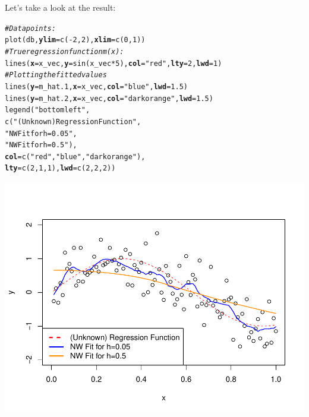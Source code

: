 \documentclass[14pt]{extreport}\usepackage[]{graphicx}\usepackage[]{xcolor}
\makeatletter
\def\maxwidth{ %
  \ifdim\Gin@nat@width>\linewidth
    \linewidth
  \else
    \Gin@nat@width
  \fi
}
\newcommand{\hlnum}[1]{\textcolor[rgb]{0.69,0.494,0}{#1}}%
\newcommand{\hlstr}[1]{\textcolor[rgb]{0.749,0.012,0.012}{#1}}%
\newcommand{\hlcom}[1]{\textcolor[rgb]{0.514,0.506,0.514}{\textit{#1}}}%
\newcommand{\hlopt}[1]{\textcolor[rgb]{0,0,0}{#1}}%
\newcommand{\hlstd}[1]{\textcolor[rgb]{0,0,0}{#1}}%
\newcommand{\hlkwc}[1]{\textcolor[rgb]{0,0,0}{\textbf{#1}}}%
\newcommand{\hlkwd}[1]{\textcolor[rgb]{0.004,0.004,0.506}{#1}}%
\newenvironment{kframe}{%
 \def\at@end@of@kframe{}%
 \ifinner\ifhmode%
  \def\at@end@of@kframe{\end{minipage}}%
  \begin{minipage}{\columnwidth}%
 \fi\fi%
 \def\FrameCommand##1{\hskip\@totalleftmargin \hskip-\fboxsep
 \colorbox{shadecolor}{##1}\hskip-\fboxsep
     \hskip-\linewidth \hskip-\@totalleftmargin \hskip\columnwidth}%
 \MakeFramed {\advance\hsize-\width
   \@totalleftmargin\z@ \linewidth\hsize
   \@setminipage}}%
 {\par\unskip\endMakeFramed%
 \at@end@of@kframe}
\newenvironment{knitrout}{}{} %
\makeatother
\begin{document}
Let's take a look at the result:
\begin{knitrout}
\color{fgcolor}\begin{kframe}
\begin{alltt}
\hlcom{# Data points:}
\hlkwd{plot}\hlstd{(db,} \hlkwc{ylim}\hlstd{=}\hlkwd{c}\hlstd{(}\hlopt{-}\hlnum{2}\hlstd{,}\hlnum{2}\hlstd{),} \hlkwc{xlim}\hlstd{=}\hlkwd{c}\hlstd{(}\hlnum{0}\hlstd{,}\hlnum{1}\hlstd{))}
\hlcom{# True regression function m(x):}
\hlkwd{lines}\hlstd{(}\hlkwc{x}\hlstd{=x_vec,} \hlkwc{y}\hlstd{=}\hlkwd{sin}\hlstd{(x_vec} \hlopt{*} \hlnum{5}\hlstd{),} \hlkwc{col}\hlstd{=}\hlstr{"red"}\hlstd{,} \hlkwc{lty}\hlstd{=}\hlnum{2}\hlstd{,} \hlkwc{lwd}\hlstd{=}\hlnum{1}\hlstd{)}
\hlcom{# Plotting the fitted values }
\hlkwd{lines}\hlstd{(}\hlkwc{y}\hlstd{= m_hat.1,} \hlkwc{x} \hlstd{= x_vec,} \hlkwc{col}\hlstd{=}\hlstr{"blue"}\hlstd{,}       \hlkwc{lwd}\hlstd{=}\hlnum{1.5}\hlstd{)}
\hlkwd{lines}\hlstd{(}\hlkwc{y}\hlstd{= m_hat.2,} \hlkwc{x} \hlstd{= x_vec,} \hlkwc{col}\hlstd{=}\hlstr{"darkorange"}\hlstd{,} \hlkwc{lwd}\hlstd{=}\hlnum{1.5}\hlstd{)}
\hlkwd{legend}\hlstd{(}\hlstr{"bottomleft"}\hlstd{,}
      \hlkwd{c}\hlstd{(}\hlstr{"(Unknown) Regression Function"}\hlstd{,}
        \hlstr{"NW Fit for h=0.05"}\hlstd{,}
        \hlstr{"NW Fit for h=0.5"}\hlstd{),}
      \hlkwc{col}\hlstd{=}\hlkwd{c}\hlstd{(}\hlstr{"red"}\hlstd{,}\hlstr{"blue"}\hlstd{,} \hlstr{"darkorange"}\hlstd{),}
      \hlkwc{lty}\hlstd{=}\hlkwd{c}\hlstd{(}\hlnum{2}\hlstd{,}\hlnum{1}\hlstd{,}\hlnum{1}\hlstd{),} \hlkwc{lwd}\hlstd{=}\hlkwd{c}\hlstd{(}\hlnum{2}\hlstd{,}\hlnum{2}\hlstd{,}\hlnum{2}\hlstd{))}
\end{alltt}
\end{kframe}

{\centering \includegraphics[width=\maxwidth]{figure/unnamed-chunk-23-1} 

}


\end{knitrout}
 
\end{document}
